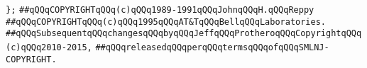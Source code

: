 \verb|};|\newline
\newline
\newline
\newline
\verb|##qQQqCOPYRIGHTqQQq(c)qQQq1989-1991qQQqJohnqQQqH.qQQqReppy|\newline
\verb|##qQQqCOPYRIGHTqQQq(c)qQQq1995qQQqAT&TqQQqBellqQQqLaboratories.|\newline
\verb|##qQQqSubsequentqQQqchangesqQQqbyqQQqJeffqQQqProtheroqQQqCopyrightqQQq(c)qQQq2010-2015,|\newline
\verb|##qQQqreleasedqQQqperqQQqtermsqQQqofqQQqSMLNJ-COPYRIGHT.|\newline

